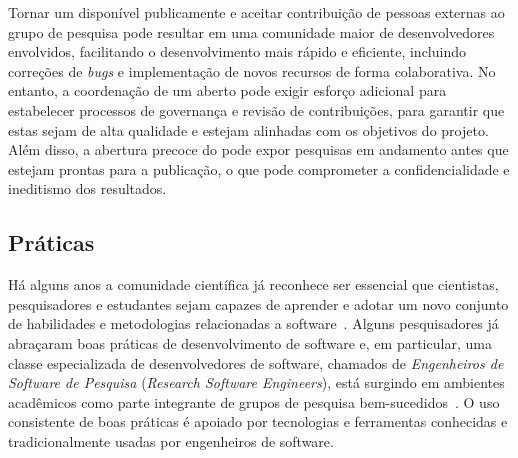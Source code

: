 Tornar um \RSw disponível publicamente e aceitar contribuição de pessoas externas ao grupo de pesquisa pode resultar em uma comunidade maior de desenvolvedores envolvidos, facilitando o desenvolvimento mais rápido e eficiente, incluindo correções de \textit{bugs} e implementação de novos recursos de forma colaborativa. No entanto, a coordenação de um \RSw aberto pode exigir esforço adicional para estabelecer processos de governança e revisão de contribuições, para garantir que estas sejam de alta qualidade e estejam alinhadas com os objetivos do projeto. 
Além disso, a abertura precoce do \RSw pode expor pesquisas em andamento antes que estejam prontas para a publicação, o que pode comprometer a confidencialidade e ineditismo dos resultados.


\subsection{Práticas} 

Há alguns anos a comunidade científica já reconhece ser essencial que cientistas, pesquisadores e estudantes sejam capazes de aprender e adotar um novo conjunto de habilidades e metodologias relacionadas a software~\cite{wssspe3}.
Alguns pesquisadores já abraçaram boas práticas de desenvolvimento de software e, em particular, uma classe especializada de desenvolvedores de software, chamados de \textit{Engenheiros de Software de Pesquisa} (\textit{Research Software Engineers}), está surgindo em ambientes acadêmicos como parte integrante de grupos de pesquisa bem-sucedidos~\cite{wssspe3}.
%
O uso consistente de boas práticas é apoiado por tecnologias e ferramentas conhecidas e tradicionalmente usadas por engenheiros de software.


